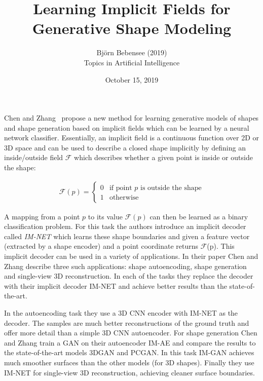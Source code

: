 \documentclass[12pt]{article}
\begin{document}
 
 
\title{Learning Implicit Fields for Generative Shape Modeling}
\author{Bj\"orn Bebensee (2019)\\ %
Topics in Artificial Intelligence}
\date{October 15, 2019}
\maketitle

\noindent
Chen and Zhang~\cite{chen} propose a new method for learning generative models of shapes and shape generation based on implicit fields which can be learned by a neural network classifier. Essentially, an implicit field is a continuous function over 2D or 3D space and can be used to describe a closed shape implicitly by defining an inside/outside field $\mathcal{F}$ which describes whether a given point is inside or outside the shape:

\begin{align*}
    \mathcal{F}(p) =
        \begin{cases}
            0 & \text{if point $p$ is outside the shape}\\
            1 & \text{otherwise}
        \end{cases}
\end{align*}

A mapping from a point $p$ to its value $\mathcal{F}(p)$ can then be learned as a binary classification problem. For this task the authors introduce an implicit decoder called \emph{IM-NET} which learns these shape boundaries and given a feature vector (extracted by a shape encoder) and a point coordinate returns $\mathcal{F}$(p). This implicit decoder can be used in a variety of applications. In their paper Chen and Zhang describe three such applications: shape autoencoding, shape generation and single-view 3D reconstruction. In each of the tasks they replace the decoder with their implicit decoder IM-NET and achieve better results than the state-of-the-art.

In the autoencoding task they use a 3D CNN encoder with IM-NET as the decoder. The samples are much better reconstructions of the ground truth and offer more detail than a simple 3D CNN autoencoder. For shape generation Chen and Zhang train a GAN on their autoencoder IM-AE and compare the results to the state-of-the-art models 3DGAN and PCGAN. In this task IM-GAN achieves much smoother surfaces than the other models (for 3D shapes). Finally they use IM-NET for single-view 3D reconstruction, achieving cleaner surface boundaries.
\end{document}
